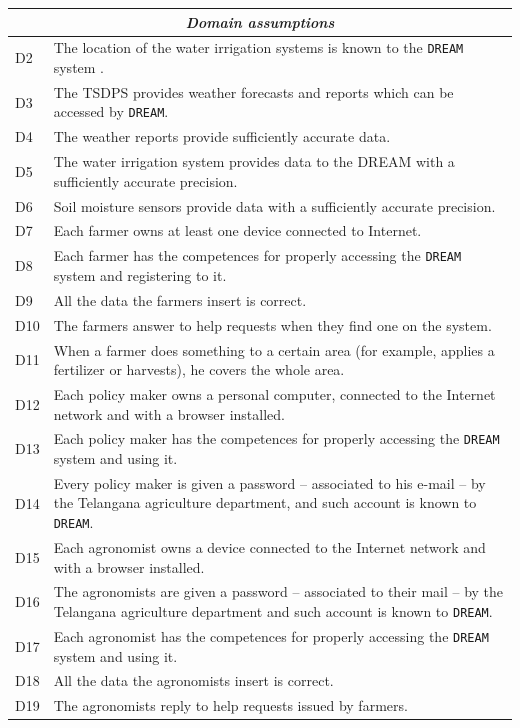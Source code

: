 \documentclass{article}
\begin{document}
\begin{longtable}[c]{|m{0.75cm}|m{11cm}|}
 \hline
 \multicolumn{2}{|c|}{\cellcolor{white}\textbf{\emph{Domain assumptions}}}
 \endfirsthead
 \endhead
 \endfoot
 \endlastfoot
  \hline
  D1 & The location of the sensors is known to the \verb|DREAM| system.\\
  \hline
   D2 & The location of the water irrigation systems is known to the \verb|DREAM| system .\\
  \hline
  D3 & The TSDPS provides weather forecasts and reports which can be accessed by \verb|DREAM|.\\
  \hline
  D4 & The weather reports provide sufficiently accurate data.\\
  \hline
  D5 & The water irrigation system provides data to the DREAM with a sufficiently accurate precision.\\
  \hline
  D6 & Soil moisture sensors provide data with a sufficiently accurate precision.\\
  \hline
  D7 & Each farmer owns at least one device connected to Internet.\\
  \hline
  D8 & Each farmer has the competences for properly accessing the \verb|DREAM| system and registering to it.\\
  \hline
  D9 & All the data the farmers insert is correct.\\
  \hline
  D10 & The farmers answer to help requests when they find one on the system.\\
  \hline
  D11 & When a farmer does something to a certain area (for example, applies a fertilizer or harvests), he covers the whole area.\\
  \hline
  D12 & Each policy maker owns a personal computer, connected to the Internet network and with a browser installed.\\
 \hline
  D13 & Each policy maker has the competences for properly accessing the \verb|DREAM| system and using it.\\
  \hline
  D14 & Every policy maker is given a password – associated to his e-mail – by the Telangana agriculture department, and such account is known to \verb|DREAM|.\\
  \hline
  D15 & Each agronomist owns a device connected to the Internet network and with a browser installed.\\
  \hline
  D16 & The agronomists are given a password – associated to their mail – by the Telangana agriculture department and such account is known to \verb|DREAM|.\\
  \hline
  D17 & Each agronomist has the competences for properly accessing the \verb|DREAM| system and using it.\\
   \hline
  D18 & All the data the agronomists insert is correct.\\
  \hline
  D19 & The agronomists reply to help requests issued by farmers.\\
  \hline
  \end{longtable}
\end{document}
